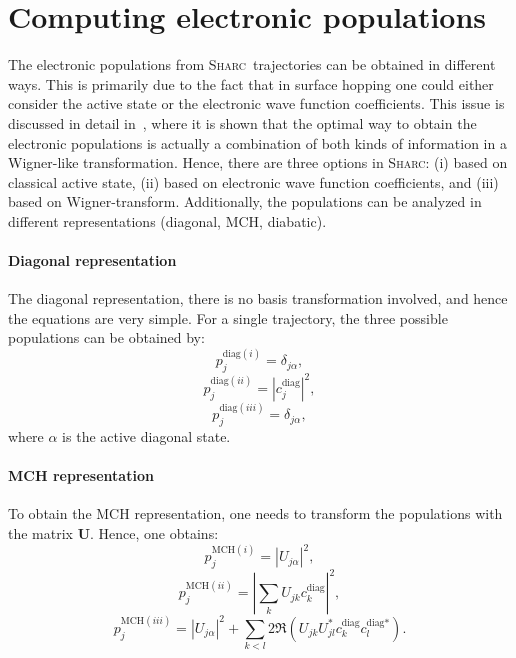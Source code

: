 \documentclass[a4paper,10pt,DIV=15,openany]{scrbook}
\newcommand{\sharc}{\textsc{Sharc}}
\newcommand{\VEC}[1]{\ensuremath{\mathbf{#1}}}
\begin{document}

\section{Computing electronic populations}\label{met:pop}

The electronic populations from \sharc\ trajectories can be obtained in different ways.
This is primarily due to the fact that in surface hopping one could either consider the active state or the electronic wave function coefficients.
This issue is discussed in detail in~\cite{Landry2013JCP}, where it is shown that the optimal way to obtain the electronic populations is actually a combination of both kinds of information in a Wigner-like transformation.
Hence, there are three options in \sharc: (i) based on classical active state, (ii) based on electronic wave function coefficients, and (iii) based on Wigner-transform.
Additionally, the populations can be analyzed in different representations (diagonal, MCH, diabatic).

\paragraph{Diagonal representation}

The diagonal representation, there is no basis transformation involved, and hence the equations are very simple.
For a single trajectory, the three possible populations can be obtained by:
\begin{equation}
  p^{\text{diag}(i)}_j=\delta_{j\alpha},
\end{equation}
\begin{equation}
  p^{\text{diag}(ii)}_j=|c^\text{diag}_j|^2,
\end{equation}
\begin{equation}
  p^{\text{diag}(iii)}_j=\delta_{j\alpha},
\end{equation}
where $\alpha$ is the active diagonal state.

\paragraph{MCH representation}

To obtain the MCH representation, one needs to transform the populations with the matrix $\VEC{U}$.
Hence, one obtains:
\begin{equation}
  p^{\text{MCH}(i)}_j=|U_{j\alpha}|^2,
\end{equation}
\begin{equation}
  p^{\text{MCH}(ii)}_j=|\sum_k U_{jk}c^\text{diag}_k|^2,
\end{equation}
\begin{equation}
  p^{\text{MCH}(iii)}_j=|U_{j\alpha}|^2+\sum_{k<l}2\Re(U_{jk}U^*_{jl}c^\text{diag}_kc^{\text{diag}*}_l).
\end{equation}
\end{document}
